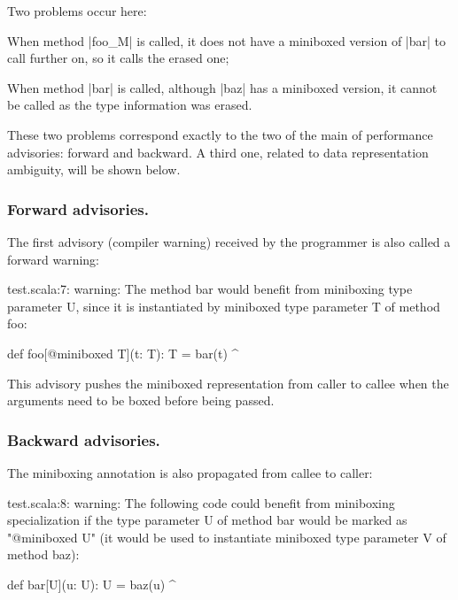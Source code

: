 Two problems occur here:

\begin{compactitem}
 \item When method |foo_M| is called, it does not have a miniboxed version of |bar| to call further on, so it calls the erased one;
 \item When method |bar| is called, although |baz| has a miniboxed version, it cannot be called as the type information was erased.
\end{compactitem}

These two problems correspond exactly to the two of the main of performance advisories: forward and backward. A third one, related to data representation ambiguity, will be shown below.

\subsubsection{Forward advisories.} The first advisory (compiler warning) received by the programmer is also called a forward warning:

\begin{lstlisting-nobreak-nolang}
test.scala:7: warning: The method bar would benefit from miniboxing type parameter U, since it is instantiated by miniboxed type parameter T of method foo:

       def foo[@miniboxed T](t: T): T = bar(t)
                                                   ^
\end{lstlisting-nobreak-nolang}

This advisory pushes the miniboxed representation from caller to callee when the arguments need to be boxed before being passed.

\subsubsection{Backward advisories.} The miniboxing annotation is also propagated from callee to caller:

\begin{lstlisting-nobreak-nolang}
test.scala:8: warning: The following code could benefit from miniboxing specialization if the type parameter U of method bar would be marked as "@miniboxed U" (it would be used to instantiate miniboxed type parameter V of method baz):

        def bar[U](u: U): U = baz(u)
                                     ^
\end{lstlisting-nobreak-nolang}

